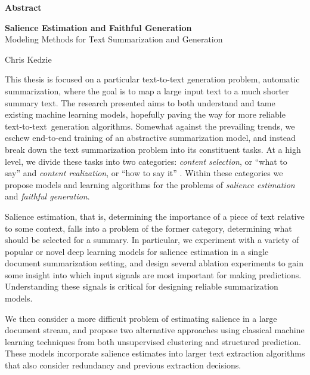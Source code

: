 
\begin{titlepage}
\begin{center}

\vspace*{5\baselineskip}
\textbf{\large Abstract}
\begin{singlespace}
\textbf{Salience Estimation and Faithful Generation}\\
Modeling Methods for Text Summarization and Generation\\
\end{singlespace}

Chris Kedzie
\end{center}

This thesis is focused on a particular text-to-text generation problem,
automatic summarization, where the goal is to map a large input text to a much
shorter summary text. The research presented aims to both understand and
tame existing machine learning models, hopefully paving the way for more
reliable text-to-text~generation algorithms.  Somewhat against the prevailing
trends, we eschew end-to-end training of an abstractive summarization model,
and instead break down the text summarization problem into its constituent
tasks.  At a high level, we divide these tasks into two categories:
\textit{content selection}, or ``what to say'' and \textit{content
realization}, or ``how to say it'' \citep{mckeown1985}.  Within these
categories we propose models and learning algorithms for the problems of 
\textit{salience estimation} and \textit{faithful generation}.

Salience estimation, that is, determining the importance of a piece of text
relative to some context, falls into a problem of the former category,
determining what should be selected for a summary.  In particular, we
experiment with a variety of popular or novel deep learning models for
salience estimation in a single document summarization setting, and design several ablation experiments to gain some
insight into which input signals are most important for making predictions.
Understanding these signals is critical for designing reliable summarization
models. 

We then consider a more difficult problem of estimating salience in a large
document stream, and propose two alternative approaches using classical
machine learning techniques from both unsupervised clustering and structured
prediction. These models incorporate salience estimates into larger text
extraction algorithms that also consider redundancy and previous extraction
decisions.


\end{titlepage}
